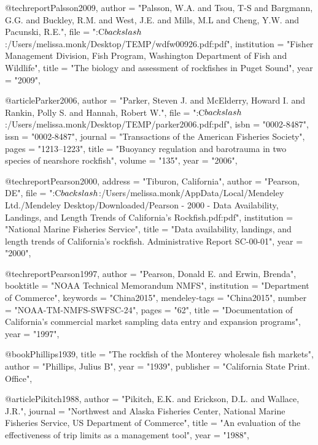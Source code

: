 {@techreport{Palsson2009,
    author = "{Palsson, W.A. and Tsou, T-S and Bargmann, G.G. and Buckley, R.M. and West, J.E. and Mills, M.L and Cheng, Y.W. and Pacunski, R.E.}",
    file = "{:C$\\backslash$:/Users/melissa.monk/Desktop/TEMP/wdfw00926.pdf:pdf}",
    institution = "{Fisher Management Division, Fish Program, Washington Department of Fish and Wildlife}",
    title = "{{The biology and assessment of rockfishes in Puget Sound}}",
    year = "{2009}",
}

@article{Parker2006,
    author = "{Parker, Steven J. and McElderry, Howard I. and Rankin, Polly S. and Hannah, Robert W.}",
    file = "{:C$\\backslash$:/Users/melissa.monk/Desktop/TEMP/parker2006.pdf:pdf}",
    isbn = "{0002-8487}",
    issn = "{0002-8487}",
    journal = "{Transactions of the American Fisheries Society}",
    pages = "{1213--1223}",
    title = "{{Buoyancy regulation and barotrauma in two species of nearshore rockfish}}",
    volume = "{135}",
    year = "{2006}",
}

@techreport{Pearson2000,
    address = "{Tiburon, California}",
    author = "{Pearson, DE}",
    file = "{:C$\\backslash$:/Users/melissa.monk/AppData/Local/Mendeley Ltd./Mendeley Desktop/Downloaded/Pearson - 2000 - Data Availability, Landings, and Length Trends of California's Rockfish.pdf:pdf}",
    institution = "{National Marine Fisheries Service}",
    title = "{{Data availability, landings, and length trends of California's rockfish. Administrative Report SC-00-01}}",
    year = "{2000}",
}

@techreport{Pearson1997,
    author = "{Pearson, Donald E. and Erwin, Brenda}",
    booktitle = "{NOAA Technical Memorandum NMFS}",
    institution = "{Department of Commerce}",
    keywords = "{China2015}",
    mendeley-tags = "{China2015}",
    number = "{NOAA-TM-NMFS-SWFSC-24}",
    pages = "{62}",
    title = "{{Documentation of California's commercial market sampling data entry and expansion programs}}",
    year = "{1997}",
}

@book{Phillips1939,
    title = "{The rockfish of the Monterey wholesale fish markets}",
    author = "{Phillips, Julius B}",
    year = "{1939}",
    publisher = "{California State Print. Office}",
}

@article{Pikitch1988,
    author = "{Pikitch, E.K. and Erickson, D.L. and Wallace, J.R.}",
    journal = "{Northwest and Alaska Fisheries Center, National Marine Fisheries Service, US Department of Commerce}",
    title = "{{An evaluation of the effectiveness of trip limits as a management tool}}",
    year = "{1988}",
}

}
